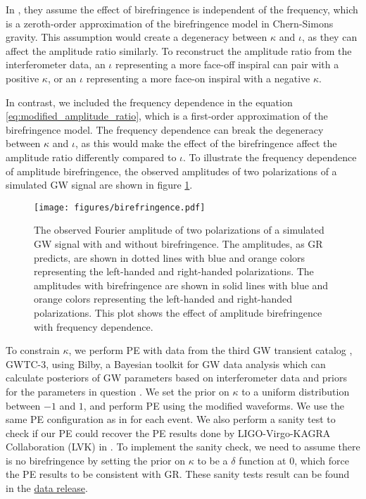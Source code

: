 \documentclass[aps,prd,twocolumn,superscriptaddress,preprintnumbers,floatfix,nofootinbib]{revtex4-2}
\begin{document}
In \citet{Okounkova_2022}, they assume the effect of birefringence is independent of the frequency, which is a zeroth-order approximation of the birefringence model in Chern-Simons gravity.
This assumption would create a degeneracy between $\kappa$ and $\iota$, as they can affect the amplitude ratio similarly.
To reconstruct the amplitude ratio from the interferometer data, an $\iota$ representing a more face-off inspiral can pair with a positive $\kappa$, or an $\iota$ representing a more face-on inspiral with a negative $\kappa$.

In contrast, we included the frequency dependence in the equation \ref{eq:modified_amplitude_ratio}, which is a first-order approximation of the birefringence model.
The frequency dependence can break the degeneracy between $\kappa$ and $\iota$, as this would make the effect of the birefringence affect the amplitude ratio differently compared to $\iota$.
To illustrate the frequency dependence of amplitude birefringence, the observed amplitudes of two polarizations of a simulated GW signal are shown in figure \ref{fig:birefringence}.

\begin{figure}[h]
    \texttt{[image: figures/birefringence.pdf]}
    \caption{
        The observed Fourier amplitude of two polarizations of a simulated GW signal with and without birefringence.
        The amplitudes, as GR predicts, are shown in dotted lines with blue and orange colors representing the left-handed and right-handed polarizations.
        The amplitudes with birefringence are shown in solid lines with blue and orange colors representing the left-handed and right-handed polarizations.
        This plot shows the effect of amplitude birefringence with frequency dependence.
    }
    \label{fig:birefringence}
\end{figure}

To constrain $\kappa$, we perform PE with data from the third GW transient catalog \citep{GWTC-2.1, GWTC-3}, GWTC-3, using Bilby, a Bayesian toolkit for GW data analysis which can calculate posteriors of GW parameters based on interferometer data and priors for the parameters in question \citep{Bilby}.
We set the prior on $\kappa$ to a uniform distribution between $-1$ and $1$, and perform PE using the modified waveforms.
We use the same PE configuration as in \citet{GWTC-2.1, GWTC-3} for each event.
We also perform a sanity test to check if our PE could recover the PE results done by LIGO-Virgo-KAGRA Collaboration (LVK) in \citet{GWTC-2.1, GWTC-3}.
To implement the sanity check, we need to assume there is no birefringence by setting the prior on $\kappa$ to be a $\delta$ function at $0$, which force the PE results to be consistent with GR.
These sanity tests result can be found in the \href{https://zenodo.org/record/7338924}{data release}.
\end{document}
